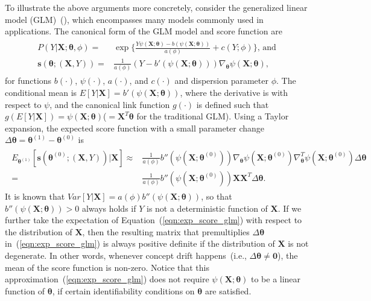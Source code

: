 \documentclass[twoside,11pt]{article}
\begin{document}
To illustrate the above arguments more concretely, consider the generalized linear model (GLM)~(\cite{nelder1972generalized}), which encompasses many models commonly used in applications. The canonical form of the GLM model and score function are
\begin{align}
\begin{aligned}
P(Y|\bm{X};\bm { \theta}, \phi) =& \exp\big\{\frac{Y \psi(\bm{X};\bm { \theta})-b( \psi(\bm{X};\bm { \theta}))}{ a ( \phi)} + c(Y; \phi)\big\}\text{,~and} \\
\bm {s}(\bm { \theta};(\bm {X}, Y)) =& \frac{1}{a( \phi)}(Y - b'( \psi (\bm{X};\bm { \theta} )))\nabla _{ \bm { \theta}} \psi(\bm{X};\bm { \theta} ),
\end{aligned}
\label{eqn:score_glm}
\end{align}
for functions $b(\cdot)$, $ \psi(\cdot)$, $a(\cdot)$, and $c(\cdot)$ and dispersion parameter $\phi$. The conditional mean is $E[Y|\bm{X}]=b'(\psi(\bm{X};\bm{\theta}))$, where the derivative is with respect to $\psi$, and the canonical link function $g(\cdot)$ is defined such that $g(E[Y|\bm{X}])=\psi(\bm{X};\bm{\theta})$($=\bm{X}^T\bm{\theta}$ for the traditional GLM). Using a Taylor expansion, the expected score function with a small parameter change $ \Delta \bm { \theta}= \bm { \theta}^{(1)}-\bm { \theta}^{(0)}$ is
\begin{align}
\begin{aligned}
E _{\bm { \theta} ^{(1)}}[\bm {s}(\bm { \theta} ^{(0)};(\bm {X}, Y))|\bm{X}] \approx& \frac{1}{a ( \phi)}b''( \psi(\bm{X}; \bm { \theta} ^{(0)}))\nabla _{ \bm { \theta}} \psi (\bm{X}; \bm { \theta} ^{ (0)}) \nabla _{\bm { \theta}}^T \psi (\bm{X}; \bm { \theta} ^{ (0)}) \Delta \bm { \theta} \\
=& \frac{1}{a ( \phi)}b''( \psi(\bm{X}; \bm { \theta} ^{(0)}))\bm {X}\bm {X}^T \Delta \bm { \theta}.
\end{aligned}
\label{eqn:exp_score_glm}
\end{align}
It is known that $Var[Y|\bm{X}] = a ( \phi)b''(\psi (\bm{X}; \bm { \theta} ))$, so that $b''(\psi (\bm{X}; \bm { \theta} ))>0$ always holds if $Y$ is not a deterministic function of $\bm{X}$. If we further take the expectation of Equation~(\ref{eqn:exp_score_glm}) with respect to the distribution of $\bm{X}$, then the resulting matrix that premultiplies $\Delta\bm{\theta}$ in~(\ref{eqn:exp_score_glm}) is always positive definite if the distribution of $\bm{X}$ is not degenerate. In other words, whenever concept drift happens~(i.e., $\Delta\bm{\theta}\neq \bm{0}$), the mean of the score function is non-zero. Notice that this approximation~(\ref{eqn:exp_score_glm}) does not require $ \psi (\bm{X}; \bm { \theta})$ to be a linear function of $\bm { \theta}$, if certain identifiability conditions on $\bm{\theta}$ are satisfied. 
\end{document}

